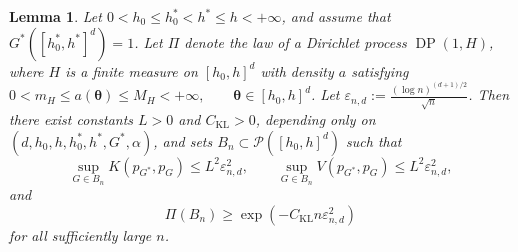 \documentclass[twoside,12pt]{article}
\newtheorem{lem}[thm]{Lemma}
\begin{document}
\begin{lem}\label{lem:Poisson_local_sets_d}
Let $0<h_0\le h_0^\ast<h^\ast\le h<+\infty$, and assume that $G^\ast([h_0^\ast,h^\ast]^d)=1$. Let $\Pi$ denote the law of a Dirichlet process $\operatorname{DP}(1,H)$, where $H$ is a finite measure on $[h_0,h]^d$ with density $a$ satisfying $0<m_H\le a(\boldsymbol\theta)\le M_H<+\infty, \qquad \boldsymbol\theta\in[h_0,h]^d$. Let $\varepsilon_{n,d}:=\frac{(\log n)^{(d+1)/2}}{\sqrt n}$. Then there exist constants $L>0$ and $C_{\mathrm{KL}}>0$, depending only on $(d,h_0,h,h_0^\ast,h^\ast,G^\ast,\alpha)$, and sets $B_n\subset\mathcal P([h_0,h]^d)$ such that 
\begin{displaymath}
\sup_{G\in B_n}K(p_{G^\ast},p_G)\le L^2\varepsilon_{n,d}^2, \qquad \sup_{G\in B_n}V(p_{G^\ast},p_G)\le L^2\varepsilon_{n,d}^2,
\end{displaymath}
and 
\begin{displaymath}
\Pi(B_n)\ge\exp(-C_{\mathrm{KL}}n\varepsilon_{n,d}^2)
\end{displaymath}
for all sufficiently large $n$.
\end{lem}
\end{document}

